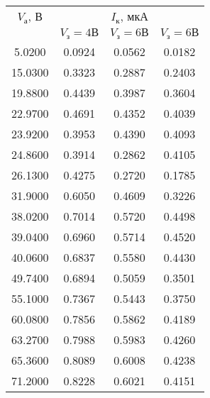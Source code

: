 \begin{tabular}{c|ccc}
\toprule
$V_\text{а}$, В & \multicolumn{3}{c}{$I_\text{к}$, мкА } \\
& $V_\text{з} = 4 \text{В}$ & $V_\text{з} = 6 \text{В}$ & $V_\text{з} = 6 \text{В}$ \\
\midrule
 5.0200 & 0.0924 & 0.0562 & 0.0182 \\
15.0300 & 0.3323 & 0.2887 & 0.2403 \\
19.8800 & 0.4439 & 0.3987 & 0.3604 \\
22.9700 & 0.4691 & 0.4352 & 0.4039 \\
23.9200 & 0.3953 & 0.4390 & 0.4093 \\
24.8600 & 0.3914 & 0.2862 & 0.4105 \\
26.1300 & 0.4275 & 0.2720 & 0.1785 \\
31.9000 & 0.6050 & 0.4609 & 0.3226 \\
38.0200 & 0.7014 & 0.5720 & 0.4498 \\
39.0400 & 0.6960 & 0.5714 & 0.4520 \\
40.0600 & 0.6837 & 0.5580 & 0.4430 \\
49.7400 & 0.6894 & 0.5059 & 0.3501 \\
55.1000 & 0.7367 & 0.5443 & 0.3750 \\
60.0800 & 0.7856 & 0.5862 & 0.4189 \\
63.2700 & 0.7988 & 0.5983 & 0.4260 \\
65.3600 & 0.8089 & 0.6008 & 0.4238 \\
71.2000 & 0.8228 & 0.6021 & 0.4151 \\
\bottomrule
\end{tabular}

